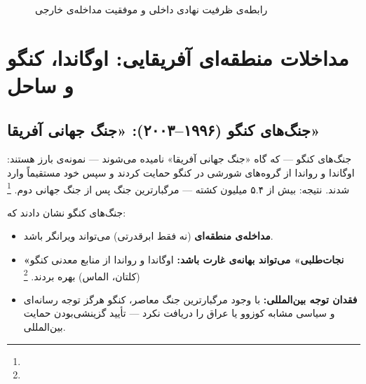 \begin{figure}[htbp]
\caption{رابطه‌ی ظرفیت نهادی داخلی و موفقیت مداخله‌ی خارجی}
\label{fig:ch10-capacity-success}
\end{figure}

\section{مداخلات منطقه‌ای آفریقایی: اوگاندا، کنگو و ساحل}
\label{sec:ch10-africa}

\subsection{جنگ‌های کنگو (۱۹۹۶–۲۰۰۳): «جنگ جهانی آفریقا»}

جنگ‌های کنگو — که گاه «جنگ جهانی آفریقا» نامیده می‌شوند — نمونه‌ی بارز  هستند: اوگاندا و رواندا از گروه‌های شورشی در کنگو حمایت کردند و سپس خود مستقیماً وارد شدند. نتیجه: بیش از ۵.۴ میلیون کشته — مرگبارترین جنگ پس از جنگ جهانی دوم.%
\footnote{}

\begin{tcolorbox}[defbox, title={درس آفریقایی}]
جنگ‌های کنگو نشان دادند که:
\begin{itemize}[nosep, rightmargin=1em]
  \item \textbf{مداخله‌ی منطقه‌ای} (نه فقط ابرقدرتی) می‌تواند ویرانگر باشد.
  \item \textbf{«نجات‌طلبی» می‌تواند بهانه‌ی غارت باشد:} اوگاندا و رواندا از منابع معدنی کنگو (کلتان، الماس) بهره بردند.%
  \footnote{}
  \item \textbf{فقدان توجه بین‌المللی:} با وجود مرگبارترین جنگ معاصر، کنگو هرگز توجه رسانه‌ای و سیاسی مشابه کوزوو یا عراق را دریافت نکرد — تأیید گزینشی‌بودن حمایت بین‌المللی.
\end{itemize}
\end{tcolorbox}

